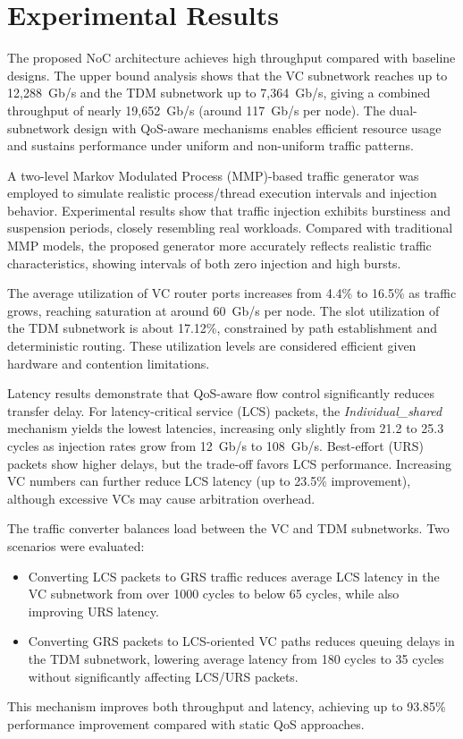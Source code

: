\section{Experimental Results}

The proposed NoC architecture achieves high throughput compared with baseline designs. The upper bound analysis shows that the VC subnetwork reaches up to 12{,}288~Gb/s and the TDM subnetwork up to 7{,}364~Gb/s, giving a combined throughput of nearly 19{,}652~Gb/s (around 117~Gb/s per node). 
The dual-subnetwork design with QoS-aware mechanisms enables efficient resource usage and sustains performance under uniform and non-uniform traffic patterns.

A two-level Markov Modulated Process (MMP)-based traffic generator was employed to simulate realistic process/thread execution intervals and injection behavior. Experimental results show that traffic injection exhibits burstiness and suspension periods, closely resembling real workloads. Compared with traditional MMP models, the proposed generator more accurately reflects realistic traffic characteristics, showing intervals of both zero injection and high bursts.

The average utilization of VC router ports increases from 4.4\% to 16.5\% as traffic grows, reaching saturation at around 60~Gb/s per node. The slot utilization of the TDM subnetwork is about 17.12\%, constrained by path establishment and deterministic routing. These utilization levels are considered efficient given hardware and contention limitations.

Latency results demonstrate that QoS-aware flow control significantly reduces transfer delay. For latency-critical service (LCS) packets, the \textit{Individual\_shared} mechanism yields the lowest latencies, increasing only slightly from 21.2 to 25.3 cycles as injection rates grow from 12~Gb/s to 108~Gb/s. 
Best-effort (URS) packets show higher delays, but the trade-off favors LCS performance. Increasing VC numbers can further reduce LCS latency (up to 23.5\% improvement), although excessive VCs may cause arbitration overhead.

The traffic converter balances load between the VC and TDM subnetworks. 
Two scenarios were evaluated:
\begin{itemize}
    \item Converting LCS packets to GRS traffic reduces average LCS latency in the VC 
    subnetwork from over 1000 cycles to below 65 cycles, while also improving URS latency.
    \item Converting GRS packets to LCS-oriented VC paths reduces queuing delays in the 
    TDM subnetwork, lowering average latency from 180 cycles to 35 cycles without 
    significantly affecting LCS/URS packets.
\end{itemize}
This mechanism improves both throughput and latency, achieving up to 93.85\% performance improvement compared with static QoS approaches.


